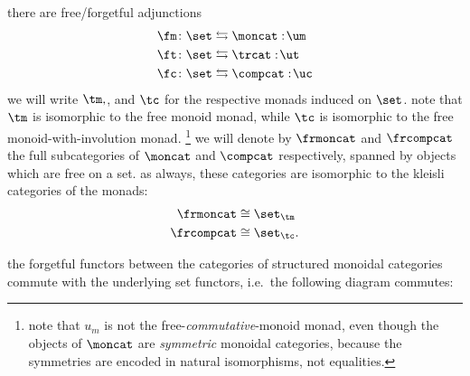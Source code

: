\documentclass[11pt,oneside,article]{memoir}
\begin{document}
there are free/forgetful adjunctions
\begin{align*}
   \fm\colon\set &\leftrightarrows\moncat:\!\um \\
   \ft\colon\set &\leftrightarrows\trcat:\!\ut \\
   \fc\colon\set &\leftrightarrows\compcat:\!\uc
\end{align*}
we will write $\tm, \tt$, and $\tc$ for the respective monads induced on $\set$. note that $\tm$ is
isomorphic to the free monoid monad, while $\tc$ is isomorphic to the free monoid-with-involution
monad.%
\footnote{
   note that $u_m$ is not the free-\emph{commutative}-monoid monad, even though the objects of
   $\moncat$ are \emph{symmetric} monoidal categories, because the symmetries are encoded in natural
   isomorphisms, not equalities.
}
we will denote by $\frmoncat$ and $\frcompcat$ the full subcategories of $\moncat$ and $\compcat$
respectively, spanned by objects which are free on a set. as always, these categories are isomorphic
to the kleisli categories of the monads:
\begin{align}\label{dia:tmvsfrmoncat}
\frmoncat&\iso\set_{\tm}
\\\nonumber
\frcompcat&\iso\set_{\tc}.
\end{align}

the forgetful functors between the categories of structured monoidal categories commute with the
underlying set functors, i.e.~the following diagram commutes:
\end{document}
